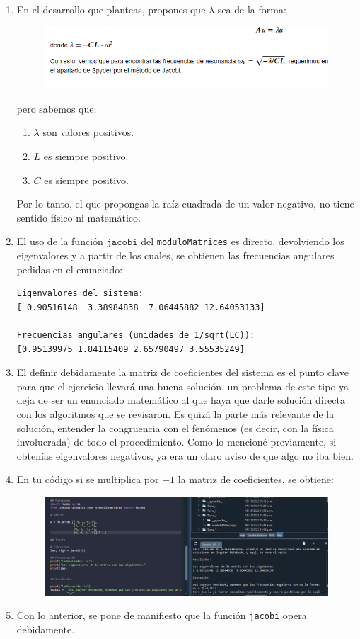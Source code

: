 \begin{enumerate}
\item En el desarrollo que planteas, propones que $\lambda$ sea de la forma:
\begin{figure}[H]
    \centering
    \includegraphics[scale=0.8]{Evidencia_Problema_06_01.png}
\end{figure}
pero sabemos que:
\begin{enumerate}
\item $\lambda$ son valores positivos.
\item $L$ es siempre positivo.
\item $C$ es siempre positivo.
\end{enumerate}
Por lo tanto, el que propongas la raíz cuadrada de un valor negativo, no tiene sentido físico ni matemático.
\item El uso de la función $\texttt{jacobi}$ del \texttt{moduloMatrices} es directo, devolviendo los eigenvalores y a partir de los cuales, se obtienen las frecuencias angulares pedidas en el enunciado:
{\fontsize{12}{12}\selectfont
\begin{verbatim}
Eigenvalores del sistema: 
[ 0.90516148  3.38984838  7.06445882 12.64053133]

Frecuencias angulares (unidades de 1/sqrt(LC)):
[0.95139975 1.84115409 2.65790497 3.55535249]
\end{verbatim}
}
\item El definir debidamente la matriz de coeficientes del sistema es el punto clave para que el ejercicio llevará una buena solución, un problema de este tipo ya deja de ser un enunciado matemático al que haya que darle solución directa con los algoritmos que se revisaron. Es quizá la parte más relevante de la solución, entender la congruencia con el fenómenos (es decir, con la física involucrada) de todo el procedimiento. Como lo mencioné previamente, si obtenías eigenvalores negativos, ya era un claro aviso de que algo no iba bien.
\item En tu código si se multiplica por $-1$ la matriz de coeficientes, se obtiene:
\begin{figure}[H]
    \centering
    \includegraphics[scale=0.5]{Evidencia_Problema_06_02.png}
\end{figure}
\item Con lo anterior, se pone de manifiesto que la función \texttt{jacobi} opera debidamente.
\end{enumerate}

